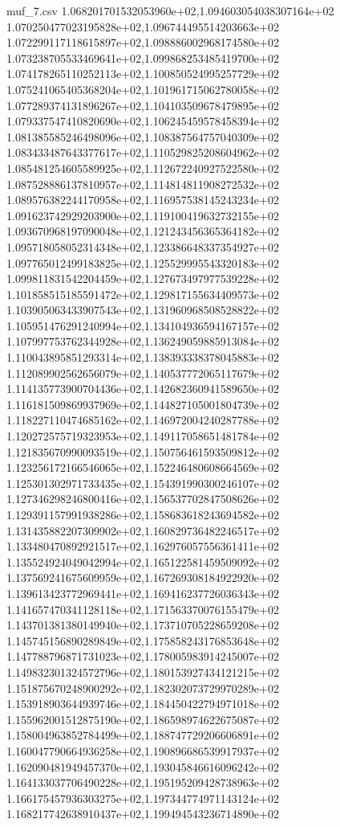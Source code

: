 \begin{filecontents*}{muf_7.csv}
1.068201701532053960e+02,1.094603054038307164e+02
1.070250477023195828e+02,1.096744495514203663e+02
1.072299117118615897e+02,1.098886002968174580e+02
1.073238705533469641e+02,1.099868253485419700e+02
1.074178265110252113e+02,1.100850524995257729e+02
1.075241065405368204e+02,1.101961715062780058e+02
1.077289374131896267e+02,1.104103509678479895e+02
1.079337547410820690e+02,1.106245459578458394e+02
1.081385585246498096e+02,1.108387564757040309e+02
1.083433487643377617e+02,1.110529825208604962e+02
1.085481254605589925e+02,1.112672240927522580e+02
1.087528886137810957e+02,1.114814811908272532e+02
1.089576382244170958e+02,1.116957538145243234e+02
1.091623742929203900e+02,1.119100419632732155e+02
1.093670968197090048e+02,1.121243456365364182e+02
1.095718058052314348e+02,1.123386648337354927e+02
1.097765012499183825e+02,1.125529995543320183e+02
1.099811831542204459e+02,1.127673497977539228e+02
1.101858515185591472e+02,1.129817155634409573e+02
1.103905063433907543e+02,1.131960968508528822e+02
1.105951476291240994e+02,1.134104936594167157e+02
1.107997753762344928e+02,1.136249059885913084e+02
1.110043895851293314e+02,1.138393338378045883e+02
1.112089902562656079e+02,1.140537772065117679e+02
1.114135773900704436e+02,1.142682360941589650e+02
1.116181509869937969e+02,1.144827105001804739e+02
1.118227110474685162e+02,1.146972004240287788e+02
1.120272575719323953e+02,1.149117058651481784e+02
1.121835670990093519e+02,1.150756461593509812e+02
1.123256172166546065e+02,1.152246480608664569e+02
1.125301302971733435e+02,1.154391990300246107e+02
1.127346298246800416e+02,1.156537702847508626e+02
1.129391157991938286e+02,1.158683618243694582e+02
1.131435882207309902e+02,1.160829736482246517e+02
1.133480470892921517e+02,1.162976057556361411e+02
1.135524924049042994e+02,1.165122581459509092e+02
1.137569241675609959e+02,1.167269308184922920e+02
1.139613423772969441e+02,1.169416237726036343e+02
1.141657470341128118e+02,1.171563370076155479e+02
1.143701381380149940e+02,1.173710705228659208e+02
1.145745156890289849e+02,1.175858243176853648e+02
1.147788796871731023e+02,1.178005983914245007e+02
1.149832301324572796e+02,1.180153927434121215e+02
1.151875670248900292e+02,1.182302073729970289e+02
1.153918903644939746e+02,1.184450422794971018e+02
1.155962001512875190e+02,1.186598974622675087e+02
1.158004963852784499e+02,1.188747729206606891e+02
1.160047790664936258e+02,1.190896686539917937e+02
1.162090481949457370e+02,1.193045846616096242e+02
1.164133037706490228e+02,1.195195209428738963e+02
1.166175457936303275e+02,1.197344774971143124e+02
1.168217742638910437e+02,1.199494543236714890e+02

\end{filecontents*}
